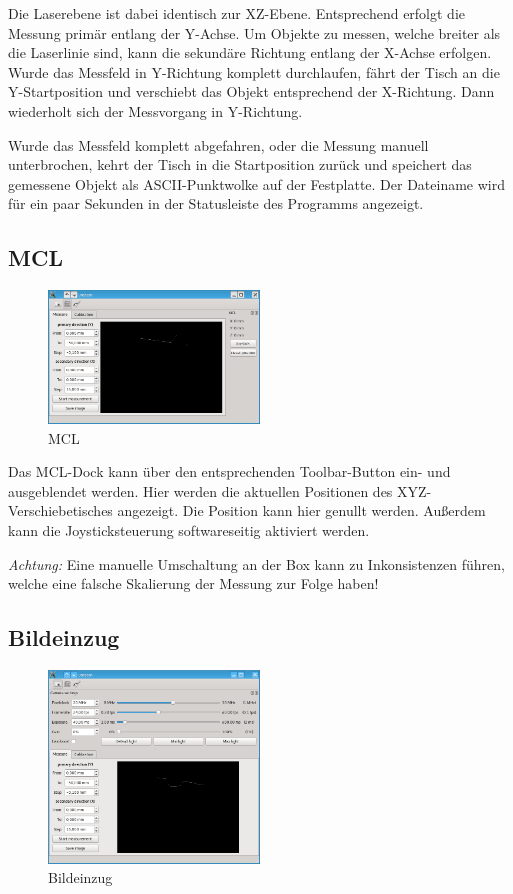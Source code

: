 \documentclass[a4paper,10pt]{scrartcl}
\begin{document}
Die Laserebene ist dabei identisch zur XZ-Ebene. Entsprechend erfolgt die Messung primär entlang
der Y-Achse. Um Objekte zu messen, welche breiter als die Laserlinie sind, kann die sekundäre
Richtung entlang der X-Achse erfolgen. Wurde das Messfeld in Y-Richtung komplett durchlaufen,
fährt der Tisch an die Y-Startposition und verschiebt das Objekt entsprechend der X-Richtung.
Dann wiederholt sich der Messvorgang in Y-Richtung.

Wurde das Messfeld komplett abgefahren, oder die Messung manuell unterbrochen, kehrt der Tisch
in die Startposition zurück und speichert das gemessene Objekt als ASCII-Punktwolke auf der
Festplatte. Der Dateiname wird für ein paar Sekunden in der Statusleiste des Programms angezeigt.

\subsection{MCL}

\begin{figure}[H]
  \centering
  \includegraphics[width=0.5\textwidth]{include/mcl.png}
  \caption{MCL}
  \label{fig:overview}
\end{figure}

Das MCL-Dock kann über den entsprechenden Toolbar-Button ein- und ausgeblendet werden.
Hier werden die aktuellen Positionen des XYZ-Verschiebetisches angezeigt. Die Position kann
hier genullt werden. Außerdem kann die Joysticksteuerung softwareseitig aktiviert werden.

\textsl{Achtung:} Eine manuelle Umschaltung an der Box kann zu Inkonsistenzen führen, welche eine
falsche Skalierung der Messung zur Folge haben!

\subsection{Bildeinzug}

\begin{figure}[H]
  \centering
  \includegraphics[width=0.5\textwidth]{include/cam.png}
  \caption{Bildeinzug}
  \label{fig:overview}
\end{figure}
\end{document}
